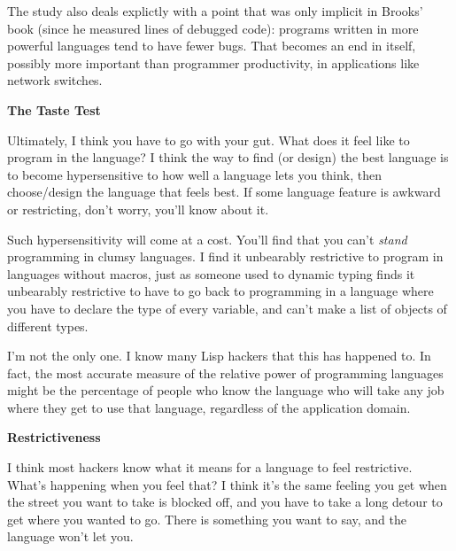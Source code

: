                   The study also deals explictly with a point that was only
                  implicit in Brooks' book (since he measured lines of debugged
                  code): programs written in more powerful languages tend to
                  have fewer bugs. That becomes an end in itself, possibly more
                  important than programmer productivity, in applications like
                  network switches.

\textbf{The Taste Test}

Ultimately, I think you have to go with your gut.
                  What does it feel like to program in the language? I think the
                  way to find (or design) the best language is to become
                  hypersensitive to how well a language lets you think, then
                  choose/design the language that feels best. If some language
                  feature is awkward or restricting, don't worry, you'll know
                  about it.

Such hypersensitivity will come at a
                  cost. You'll find that you can't \emph{stand} programming in
                  clumsy languages. I find it unbearably restrictive to program
                  in languages without macros, just as someone used to dynamic
                  typing finds it unbearably restrictive to have to go back to
                  programming in a language where you have to declare the type
                  of every variable, and can't make a list of objects of
                  different types.
                  

I'm not the only one. I know many Lisp hackers that
                  this has happened to. In fact, the most accurate measure of
                  the relative power of programming languages might be the
                  percentage of people who know the language who will take any
                  job where they get to use that language, regardless of the
                  application domain.

\textbf{Restrictiveness}

I think most hackers know what it means for a
                  language to feel restrictive. What's happening when you feel
                  that? I think it's the same feeling you get when the street
                  you want to take is blocked off, and you have to take a long
                  detour to get where you wanted to go. There is something you
                  want to say, and the language won't let you.

